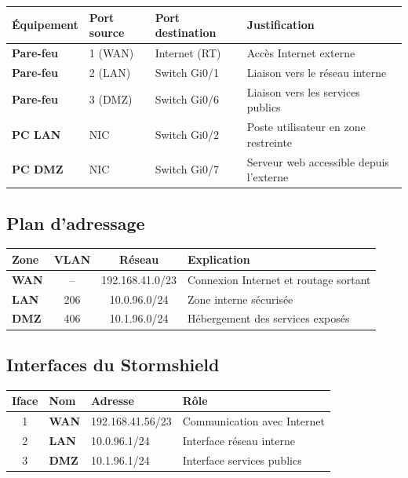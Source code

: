 \documentclass[11pt,a4paper]{article}
\begin{document}
\renewcommand{\arraystretch}{1.3}
\begin{tabularx}{\linewidth}{@{}>{\bfseries}l l l X@{}}
\toprule
\rowcolor{light} Équipement & Port source & Port destination & Justification \\ \midrule
Pare-feu & 1 (WAN)  & Internet (RT)   & Accès Internet externe \\
Pare-feu & 2 (LAN)  & Switch Gi0/1    & Liaison vers le réseau interne \\
Pare-feu & 3 (DMZ)  & Switch Gi0/6    & Liaison vers les services publics \\
PC LAN   & NIC      & Switch Gi0/2    & Poste utilisateur en zone restreinte \\
PC DMZ   & NIC      & Switch Gi0/7    & Serveur web accessible depuis l'externe \\
\bottomrule
\end{tabularx}

\subsection{Plan d'adressage}

\begin{tabularx}{\linewidth}{@{}>{\bfseries}l c c X@{}}
\toprule
\rowcolor{light} Zone & VLAN & Réseau & Explication \\ \midrule
WAN & --  & 192.168.41.0/23 & Connexion Internet et routage sortant \\
LAN & 206 & 10.0.96.0/24    & Zone interne sécurisée \\
DMZ & 406 & 10.1.96.0/24    & Hébergement des services exposés \\
\bottomrule
\end{tabularx}

\subsection{Interfaces du Stormshield}

\begin{tabularx}{\linewidth}{@{}c >{\bfseries}l l X@{}}
\toprule
\rowcolor{light} Iface & Nom & Adresse & Rôle \\ \midrule
1 & WAN & 192.168.41.56/23 & Communication avec Internet \\
2 & LAN & 10.0.96.1/24     & Interface réseau interne \\
3 & DMZ & 10.1.96.1/24     & Interface services publics \\
\bottomrule
\end{tabularx}
\end{document}
